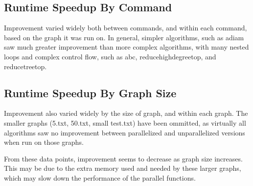 \documentclass[12pt]{article}
\begin{document}
\subsection{Runtime Speedup By Command}

Improvement varied widely both between commands, and within each command, based on the graph it was run on. In general, simpler algorithms, such as adiam saw much greater improvement than more complex algorithms, with many nested loops and complex control flow, such as abc, reducehighdegreetop, and reducetreetop.

\subsection{Runtime Speedup By Graph Size}

Improvement also varied widely by the size of graph, and within each graph. The smaller graphs (5.txt, 50.txt, small test.txt) have been ommitted, as virtually all algorithms saw no improvement between parallelized and unparallelized versions when run on those graphs.

From these data points, improvement seems to decrease as graph size increases. This may be due to the extra memory used and needed by these larger graphs, which may slow down the performance of the parallel functions.
\end{document}
